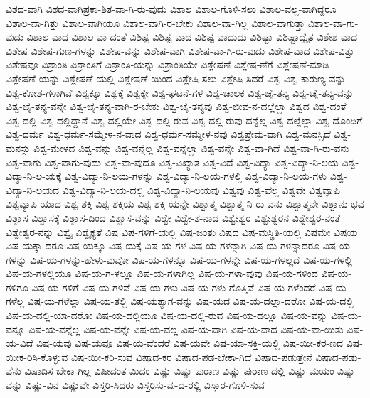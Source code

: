 {ವಿಶದ-ವಾಗಿ
ವಿಶದ-ವಾಗಿಪ್ರಕಾ-ಶಿತ-ವಾ-ಗಿ-ರು-ವುದು
ವಿಶಾಲ
ವಿಶಾಲ-ಗೊಳಿ-ಸಲು
ವಿಶಾಲ-ವಲ್ಲ-ವಾಗಿದ್ದರೂ
ವಿಶಾಲ-ವಾ-ಗಿತ್ತು
ವಿಶಾಲ-ವಾಗಿಯೂ
ವಿಶಾಲ-ವಾಗಿ-ರ-ಬೇಕು
ವಿಶಾಲ-ವಾ-ಗಿಲ್ಲ
ವಿಶಾಲ-ವಾಗುತ್ತಾ
ವಿಶಾಲ-ವಾ-ಗು-ವುದು
ವಿಶಾಲ-ವಾದ
ವಿಶಾಲ-ವಾ-ದಂತೆ
ವಿಶಿಷ್ಟ
ವಿಶಿಷ್ಟ-ವಾದ
ವಿಶಿಷ್ಟ-ವಾದುದು
ವಿಶಿಷ್ಟಾ
ವಿಶಿಷ್ಟಾದ್ವೈತ
ವಿಶೇಶ-ವಾದ
ವಿಶೇಷ
ವಿಶೇಷ-ಗುಣ-ಗಳನ್ನು
ವಿಶೇಷ-ವನ್ನು
ವಿಶೇಷ-ವಾಗಿ
ವಿಶೇಷ-ವಾ-ಗಿ-ರು-ವುದು
ವಿಶೇಷ-ವಾದ
ವಿಶೇಷ-ವಿತ್ತು
ವಿಶೇಷವೂ
ವಿಶ್ರಾಂತಿ
ವಿಶ್ರಾಂತಿಗೆ
ವಿಶ್ರಾಂತಿ-ಯನ್ನು
ವಿಶ್ರಾಂತಿಯೇ
ವಿಶ್ಲೇಷಣೆ
ವಿಶ್ಲೇಷ-ಣೆಗೆ
ವಿಶ್ಲೇಷಣೆ-ಮಾಡಿ
ವಿಶ್ಲೇಷಣೆ-ಯನ್ನು
ವಿಶ್ಲೇಷಣೆ-ಯಲ್ಲಿ
ವಿಶ್ಲೇಷಣೆ-ಯಿಂದ
ವಿಶ್ಲೇಷಿ-ಸಲು
ವಿಶ್ಲೇಷಿ-ಸಿದರೆ
ವಿಶ್ವ
ವಿಶ್ವ-ಕಾರುಣ್ಯ-ವನ್ನು
ವಿಶ್ವ-ಕೋಶ-ಗಳಾಗಿವೆ
ವಿಶ್ವಕ್ಕೂ
ವಿಶ್ವಕ್ಕೆ
ವಿಶ್ವಕ್ಕೇ
ವಿಶ್ವ-ಘಟನೆ-ಗಳ
ವಿಶ್ವ-ಚಾಲಕ
ವಿಶ್ವ-ಚೈ-ತನ್ಯ
ವಿಶ್ವ-ಚೈ-ತನ್ಯ-ವನ್ನು
ವಿಶ್ವ-ಚೈ-ತನ್ಯ-ವನ್ನೇ
ವಿಶ್ವ-ಚೈ-ತನ್ಯ-ವಾಗಿ-ರ-ಬೇಕು
ವಿಶ್ವ-ಚೈ-ತನ್ಯವು
ವಿಶ್ವ-ಜೀವ-ನ-ದಲ್ಲೆಲ್ಲಾ
ವಿಶ್ವದ
ವಿಶ್ವ-ದಂತೆ
ವಿಶ್ವ-ದಲ್ಲಿ
ವಿಶ್ವ-ದಲ್ಲಿದ್ದಾನೆ
ವಿಶ್ವ-ದಲ್ಲಿಯೇ
ವಿಶ್ವ-ದಲ್ಲಿ-ರುವ
ವಿಶ್ವ-ದಲ್ಲಿ-ರುವು-ದನ್ನೆಲ್ಲ
ವಿಶ್ವ-ದಲ್ಲೆಲ್ಲಾ
ವಿಶ್ವ-ದೊಂದಿಗೆ
ವಿಶ್ವ-ಧರ್ಮ
ವಿಶ್ವ-ಧರ್ಮ-ಸಮ್ಮೇಳ-ನ-ವಾದ
ವಿಶ್ವ-ಧರ್ಮ-ಸಮ್ಮೇಳ-ನವು
ವಿಶ್ವಪ್ರೇಮ-ವಾಗಿ
ವಿಶ್ವ-ಮನಸ್ಸಿದೆ
ವಿಶ್ವ-ಮನಸ್ಸು
ವಿಶ್ವ-ಮೇಳದ
ವಿಶ್ವ-ವನ್ನು
ವಿಶ್ವ-ವನ್ನೆಲ್ಲ
ವಿಶ್ವ-ವನ್ನೆಲ್ಲಾ
ವಿಶ್ವ-ವನ್ನೇ
ವಿಶ್ವ-ವಾ-ಗಿದೆ
ವಿಶ್ವ-ವಾ-ಗಿ-ರು-ವನು
ವಿಶ್ವ-ವಾಗು
ವಿಶ್ವ-ವಾಗು-ವುದು
ವಿಶ್ವ-ವಾ-ವುದೂ
ವಿಶ್ವ-ವಿಖ್ಯಾತ
ವಿಶ್ವ-ವಿದೆ
ವಿಶ್ವ-ವಿದ್ಯಾ
ವಿಶ್ವ-ವಿದ್ಯಾ-ನಿ-ಲಯ
ವಿಶ್ವ-ವಿದ್ಯಾ-ನಿ-ಲ-ಯಕ್ಕೆ
ವಿಶ್ವ-ವಿದ್ಯಾ-ನಿ-ಲಯ-ಗಳನ್ನು
ವಿಶ್ವ-ವಿದ್ಯಾ-ನಿ-ಲಯ-ಗಳಲ್ಲಿ
ವಿಶ್ವ-ವಿದ್ಯಾ-ನಿ-ಲಯ-ಗಳು
ವಿಶ್ವ-ವಿದ್ಯಾ-ನಿ-ಲಯದ
ವಿಶ್ವ-ವಿದ್ಯಾ-ನಿ-ಲಯ-ದಲ್ಲಿ
ವಿಶ್ವ-ವಿದ್ಯಾ-ನಿ-ಲಯವು
ವಿಶ್ವವು
ವಿಶ್ವ-ವೆಲ್ಲ
ವಿಶ್ವವೇ
ವಿಶ್ವವ್ಯಾಪಿ
ವಿಶ್ವವ್ಯಾಪಿ-ಯಾದ
ವಿಶ್ವ-ಶಕ್ತಿ
ವಿಶ್ವ-ಶಕ್ತಿಯ
ವಿಶ್ವ-ಶಕ್ತಿ-ಯನ್ನೇ
ವಿಶ್ವಾತ್ಮ
ವಿಶ್ವಾತ್ಮ-ನಿ-ರು-ವನು
ವಿಶ್ವಾತ್ಮನೇ
ವಿಶ್ವಾನು-ಭವ
ವಿಶ್ವಾಸ
ವಿಶ್ವಾಸಕ್ಕೆ
ವಿಶ್ವಾಸ-ದಿಂದ
ವಿಶ್ವಾಸ-ವನ್ನು
ವಿಶ್ವೇ
ವಿಶ್ವೇ-ಶ-ನಾದ
ವಿಶ್ವೇಶ್ವರ
ವಿಶ್ವೇಶ್ವರನ
ವಿಶ್ವೇಶ್ವರ-ನಂತೆ
ವಿಶ್ವೇಶ್ವರ-ನನ್ನು
ವಿಶ್ವೈ
ವಿಶ್ವೈಕ್ಯತೆ
ವಿಷ
ವಿಷ-ಗಳಿಗೆ-ಯಲ್ಲಿ
ವಿಷ-ಜಂತು
ವಿಷದ
ವಿಷ-ಮಸ್ಥಿತಿ-ಯಲ್ಲಿ
ವಿಷಮೇ
ವಿಷಯ
ವಿಷ-ಯಕ್ಕಾ-ದರೂ
ವಿಷ-ಯಕ್ಕೂ
ವಿಷ-ಯಕ್ಕೆ
ವಿಷ-ಯ-ಗಳ
ವಿಷ-ಯ-ಗಳನ್ನಾಗಿ
ವಿಷ-ಯ-ಗಳನ್ನಾದರೂ
ವಿಷ-ಯ-ಗಳನ್ನು
ವಿಷ-ಯ-ಗಳನ್ನು-ಹೇಳು-ವುವೋ
ವಿಷ-ಯ-ಗಳನ್ನೂ
ವಿಷ-ಯ-ಗಳನ್ನೇ
ವಿಷ-ಯ-ಗಳಲ್ಲದೆ
ವಿಷ-ಯ-ಗಳಲ್ಲಿ
ವಿಷ-ಯ-ಗಳಲ್ಲಿಯೂ
ವಿಷ-ಯ-ಗ-ಳಲ್ಲೂ
ವಿಷ-ಯ-ಗಳಾಗಿಲ್ಲ
ವಿಷ-ಯ-ಗಳಾ-ವುವು
ವಿಷ-ಯ-ಗಳಿಂದ
ವಿಷ-ಯ-ಗಳಿಗೂ
ವಿಷ-ಯ-ಗಳಿಗೆ
ವಿಷ-ಯ-ಗಳಿವೆ
ವಿಷ-ಯ-ಗಳು
ವಿಷ-ಯ-ಗಳು-ಗೊತ್ತಿವೆ
ವಿಷ-ಯ-ಗಳೆಂದರೆ
ವಿಷ-ಯ-ಗಳೆಲ್ಲ
ವಿಷ-ಯ-ಗಳೆಲ್ಲಾ
ವಿಷ-ಯ-ತಲ್ಲಿ
ವಿಷ-ಯತ್ಯಾಗ-ವನ್ನು
ವಿಷ-ಯದ
ವಿಷ-ಯ-ದಲ್ಲಾ-ದರೋ
ವಿಷ-ಯ-ದಲ್ಲಿ
ವಿಷ-ಯ-ದಲ್ಲಿ-ಯಾ-ದರೋ
ವಿಷ-ಯ-ದಲ್ಲಿಯೂ
ವಿಷ-ಯ-ದಲ್ಲಿ-ರುವ
ವಿಷ-ಯ-ದಲ್ಲೂ
ವಿಷ-ಯ-ವನ್ನು
ವಿಷ-ಯ-ವನ್ನೂ
ವಿಷ-ಯ-ವನ್ನೆಲ್ಲ
ವಿಷ-ಯ-ವನ್ನೇ
ವಿಷ-ಯ-ವಲ್ಲ
ವಿಷ-ಯ-ವಾಗಿ
ವಿಷ-ಯ-ವಾದ
ವಿಷ-ಯ-ವಾ-ಯಿತು
ವಿಷ-ಯ-ವಿದೆ
ವಿಷ-ಯವು
ವಿಷ-ಯವೂ
ವಿಷ-ಯ-ವೆಂದರೆ
ವಿಷ-ಯವೇ
ವಿಷ-ಯಾ-ಸಕ್ತಿ-ಯಲ್ಲಿ
ವಿಷ-ಯೀ-ಕರ-ಣದ
ವಿಷ-ಯೀಕ-ರಿಸಿ-ಕೊಳ್ಳುವ
ವಿಷ-ಯೀ-ಕರಿ-ಸುವ
ವಿಷಾದ-ಕರ
ವಿಷಾದ-ಪಡ-ಬೇಕಾ-ಗಿದೆ
ವಿಷಾದ-ಪಡುತ್ತೇನೆ
ವಿಷಾದ-ಪಡು-ವೆನು
ವಿಷಾದಿಸ-ಬೇಕಾ-ಗಿಲ್ಲ
ವಿಷೀದಂತ-ಮಿದಂ
ವಿಷ್ಣು
ವಿಷ್ಣು-ಪುರಾಣ
ವಿಷ್ಣು-ಪುರಾಣ-ದಲ್ಲಿ
ವಿಷ್ಣು-ಮಯಂ
ವಿಷ್ಣು-ವನ್ನು
ವಿಷ್ಣು-ವಿನ
ವಿಷ್ಣುವೇ
ವಿಸ್ತರಿ-ಸಿದರು
ವಿಸ್ತರಿಸು-ವು-ದ-ರಲ್ಲಿ
ವಿಸ್ತಾರ-ಗೊಳಿ-ಸುವ
}
